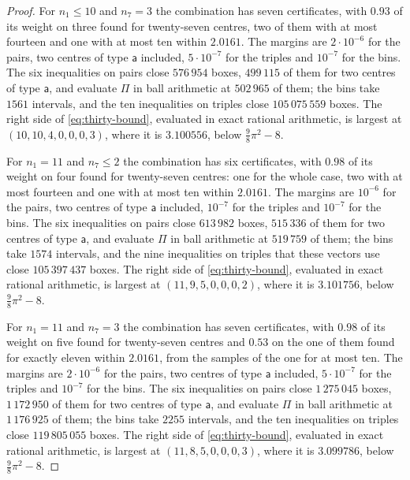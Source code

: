 \documentclass[11pt,reqno]{amsart}
\renewcommand{\_}{\origunderscore\allowbreak}
\numberwithin{equation}{section}
\theoremstyle{plain}
\theoremstyle{definition}
\theoremstyle{remark}
\begin{document}
\begin{proof}
For $n_1\le10$ and $n_7=3$ the combination has seven certificates, with
$0.93$ of its weight
on three found for twenty-seven centres, two of them with at most fourteen
and one with at most ten within $2.0161$. The margins are
$2\cdot10^{-6}$ for the pairs, two centres of type $\mathsf a$ included,
$5\cdot10^{-7}$ for the triples and $10^{-7}$ for the bins. The six
inequalities on pairs close $576\,954$ boxes, $499\,115$ of them for two
centres of type $\mathsf a$, and evaluate $\Pi$ in ball arithmetic at
$502\,965$ of them; the bins take $1561$ intervals, and the ten
inequalities on triples close $105\,075\,559$ boxes. The right side of
\eqref{eq:thirty-bound}, evaluated in exact rational arithmetic, is largest
at $(10,10,4,0,0,0,3)$, where it is $3.100556$, below $\frac98\pi^2-8$.

For $n_1=11$ and $n_7\le2$ the combination has six certificates, with
$0.98$ of its weight on four found for twenty-seven centres: one for the
whole case, two with at most fourteen and one with at most ten within
$2.0161$. The margins are $10^{-6}$ for the pairs, two centres of type
$\mathsf a$ included, $10^{-7}$ for the triples and $10^{-7}$ for the bins.
The six inequalities on pairs close $613\,982$ boxes, $515\,336$ of them for two
centres of type $\mathsf a$, and evaluate $\Pi$ in ball arithmetic at $519\,759$
of them; the bins take $1574$ intervals, and the nine inequalities on triples
that these vectors use close $105\,397\,437$ boxes. The right side of
\eqref{eq:thirty-bound}, evaluated in exact rational arithmetic, is largest
at $(11,9,5,0,0,0,2)$, where it is $3.101756$, below $\frac98\pi^2-8$.

For $n_1=11$ and $n_7=3$ the combination has seven certificates, with $0.98$
of its weight on five found for twenty-seven centres and $0.53$ on the one
of them found for exactly eleven within $2.0161$, from the samples of the
one for at most ten. The margins are $2\cdot10^{-6}$ for the pairs, two
centres of type $\mathsf a$ included, $5\cdot10^{-7}$ for the triples and
$10^{-7}$ for the bins. The six inequalities on pairs close $1\,275\,045$ boxes, $1\,172\,950$
of them for two centres of type $\mathsf a$, and evaluate $\Pi$ in ball
arithmetic at $1\,176\,925$ of them; the bins take $2255$ intervals, and the ten
inequalities on triples close $119\,805\,055$ boxes. The right side of
\eqref{eq:thirty-bound}, evaluated in exact rational arithmetic, is largest
at $(11,8,5,0,0,0,3)$, where it is $3.099786$, below $\frac98\pi^2-8$.


\end{proof}
\end{document}
